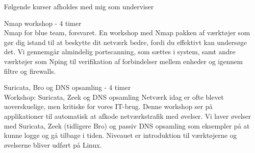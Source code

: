 \documentclass[Screen16to9,17pt]{foils}
\begin{document}
\begin{list1}
\item Følgende kurser afholdes med mig som underviser
\begin{list2}
\item Nmap workshop - 4 timer\\
Nmap for blue team, forsvaret.
En workshop med Nmap pakken af værktøjer som gør dig istand til at beskytte dit netværk bedre, fordi du effektivt kan undersøge det.
Vi gennemgår almindelig portscanning, som sættes i system, samt andre værktøjer som Nping til verifikation af forbindelser mellem enheder og igennem filtre og firewalls.
\vskip 1cm
\item Suricata, Bro og DNS opsamling - 4 timer\\
Workshop: Suricata, Zeek og DNS opsamling
Netværk idag er ofte blevet uoverskuelige, men kritiske for vores IT-brug. Denne workshop ser på applikationer til automatisk at afkode netværkstrafik med øvelser. Vi laver øvelser med Suricata, Zeek (tidligere Bro) og passiv DNS opsamling som eksempler på at kunne logge og gå tilbage i tiden. Niveauet er introduktion til værktøjerne og øvelserne bliver udført på Linux.
\end{list2}
\end{list1}
\end{document}
